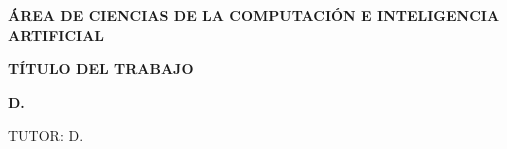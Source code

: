 \begin{titlepage}
  \thispagestyle{empty}
  \centering

  \vspace*{0.95cm}
  \safetitlelogo

  \vspace{2.75cm}

  {\Large\bfseries\MakeUppercase{\SchoolName}\par}

  \vspace{1.55cm}

  {\large\bfseries\MakeUppercase{\DegreeName}\par}

  \vspace{1.55cm}

  {\normalsize\bfseries ÁREA DE CIENCIAS DE LA COMPUTACIÓN E INTELIGENCIA ARTIFICIAL\par}

  \vspace{1.25cm}

  {\normalsize\bfseries TÍTULO DEL TRABAJO\par}
  \vspace{0.55cm}
  \begin{minipage}{0.86\textwidth}
    \centering
    {\fontsize{18}{22}\selectfont\bfseries\ThesisTitle\par}
  \end{minipage}

  \vfill

  \begin{minipage}{0.72\textwidth}
    \centering
    \small\bfseries
    D. \MakeUppercase{\AuthorName}\par
    TUTOR: D. \SupervisorName\par
  \end{minipage}
\end{titlepage}
